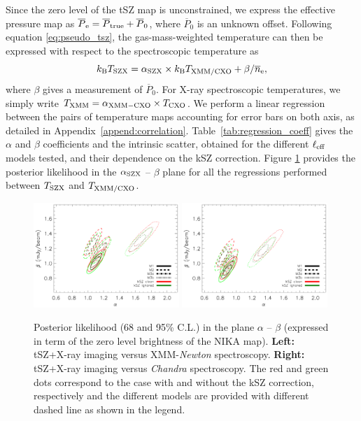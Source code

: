 \documentclass[twocolumn,traditabstract]{aa}
\def\TSZ {T_{\rm SZX}}
\def \TXC {T_{\rm CXO}}
\def \TXX {T_{\rm XMM}}
\def \TXXC {T_{\rm XMM/CXO}}
\begin{document}
Since the zero level of the tSZ map is unconstrained, we express the effective pressure map as $\overline{P}_{\rm e} = \overline{P}_{\rm true} + \overline{P}_0$, where $\overline{P}_0$ is an unknown offset. Following equation \ref{eq:pseudo_tsz}, the gas-mass-weighted temperature can then be expressed with respect to the spectroscopic temperature as
\begin{equation}
k_{\rm B} \TSZ = \alpha_{\rm SZX} \times k_{\rm B} \TXXC+ {\beta}/{\overline{n}_{\rm e}},
\label{eq:TSZ_TX_regression}
\end{equation}
where $\beta$ gives a measurement of $\overline{P}_0$. For X-ray spectroscopic temperatures, we simply write $\TXX = \alpha_{\rm XMM-CXO} \times \TXC$. We perform a linear regression between the pairs of temperature maps accounting for error bars on both axis, as detailed in Appendix~\ref{append:correlation}. Table~\ref{tab:regression_coeff} gives the $\alpha $ and $\beta$ coefficients and the intrinsic scatter, obtained for the different $\ell_{\rm eff}$ models tested, and their dependence on the kSZ correction. Figure \ref{fig:T_SZ_T_X_posterior} provides the posterior likelihood in the $\alpha_{\rm SZX}$ -- $\beta$ plane for all the regressions performed between $\TSZ$ and ${T}_{\rm XMM/CXO}$.

\begin{figure}[h]
\centering
\includegraphics[width=0.49\textwidth]{Figure/Fit_Results_Likelihood_gmw-XMM.pdf}
\includegraphics[width=0.49\textwidth]{Figure/Fit_Results_Likelihood_gmw-CXO.pdf}
\caption{\footnotesize Posterior likelihood (68 and 95\% C.L.) in the plane $\alpha$ -- $\beta$ (expressed in term of the zero level brightness of the NIKA map). {\bf Left:} tSZ+X-ray imaging versus XMM-\textit{Newton} spectroscopy. {\bf Right:} tSZ+X-ray imaging versus \textit{Chandra} spectroscopy. The red and green dots correspond to the case with and without the kSZ correction, respectively and the different models are provided with different dashed line as shown in the legend.}
\label{fig:T_SZ_T_X_posterior}
\end{figure}
\end{document}
